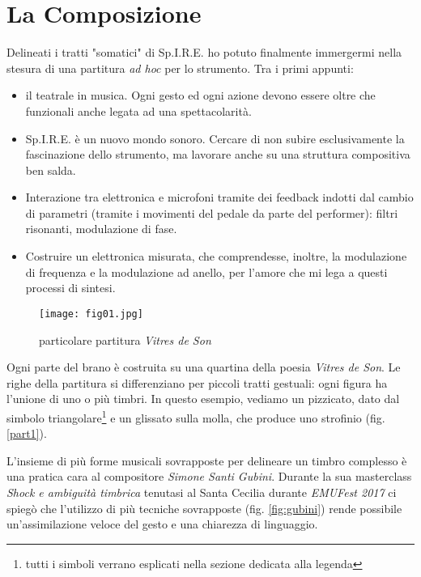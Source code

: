 
\chapter{La Composizione}
\label{chp:La Composizione}

Delineati i tratti "somatici" di Sp.I.R.E. ho potuto finalmente immergermi nella stesura di una partitura \textit{ad hoc} per lo strumento. Tra i primi appunti:

\begin{itemize}
\item{il teatrale in musica. Ogni gesto ed ogni azione devono essere oltre che funzionali anche legata ad una spettacolarità.}
\item{Sp.I.R.E. è un nuovo mondo sonoro. Cercare di non subire esclusivamente la fascinazione dello strumento, ma lavorare anche su una struttura compositiva ben salda.}
\item{Interazione tra elettronica e microfoni tramite dei feedback indotti dal cambio di parametri (tramite i movimenti del pedale da parte del performer): filtri risonanti, modulazione di fase.}
\item{Costruire un elettronica misurata, che comprendesse, inoltre, la modulazione di frequenza e la modulazione ad anello, per l'amore che mi lega a questi processi di sintesi.}
\end{itemize}

\begin{wrapfigure}{r}{5cm}
\centering
\texttt{[image: fig01.jpg]}
\caption{particolare partitura \textit{Vitres de Son}}
\label{fig:part1}
\end{wrapfigure}

Ogni parte del brano è costruita su una quartina della poesia \textit{Vitres de Son}. Le righe della partitura si differenziano per piccoli tratti gestuali: ogni figura ha l'unione di uno o più timbri. In questo esempio, vediamo un pizzicato, dato dal simbolo triangolare\footnote{tutti i simboli verrano esplicati nella sezione dedicata alla legenda} e un glissato sulla molla, che produce uno strofinio (fig. \ref{part1}). 

L'insieme di più forme musicali sovrapposte per delineare un timbro complesso è una pratica cara al compositore \textit{Simone Santi Gubini}. Durante la sua masterclass \textit{Shock e ambiguità timbrica} tenutasi al Santa Cecilia durante \textit{EMUFest 2017} ci spiegò che l'utilizzo di più tecniche sovrapposte (fig. \ref{fig:gubini}) rende possibile un'assimilazione veloce del gesto e una chiarezza di linguaggio. 

